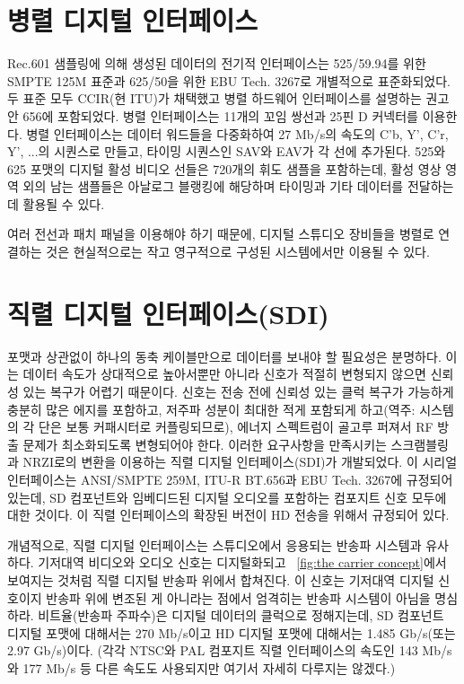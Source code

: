 \section{병렬 디지털 인터페이스}
Rec.601 샘플링에 의해 생성된 데이터의 전기적 인터페이스는 525/59.94를 위한 SMPTE 125M 표준과 625/50을 위한 EBU Tech. 3267로 개별적으로 표준화되었다. 두 표준 모두 CCIR(현 ITU)가 채택했고 병렬 하드웨어 인터페이스를 설명하는 권고안 656에 포함되었다.
병렬 인터페이스는 11개의 꼬임 쌍선과 25핀 D 커넥터를 이용한다. 병렬 인터페이스는 데이터 워드들을 다중화하여 27 Mb/s의 속도의 C'b, Y', C'r, Y', ...의 시퀀스로 만들고, 타이밍 시퀀스인 SAV와 EAV가 각 선에 추가된다.
525와 625 포맷의 디지털 활성 비디오 선들은 720개의 휘도 샘플을 포함하는데, 활성 영상 영역 외의 남는 샘플들은 아날로그 블랭킹에 해당하며 타이밍과 기타 데이터를 전달하는 데 활용될 수 있다.

여러 전선과 패치 패널을 이용해야 하기 때문에, 디지털 스튜디오 장비들을 병렬로 연결하는 것은 현실적으로는 작고 영구적으로 구성된 시스템에서만 이용될 수 있다.

\section{직렬 디지털 인터페이스(SDI)}
포맷과 상관없이 하나의 동축 케이블만으로 데이터를 보내야 할 필요성은 분명하다. 이는 데이터 속도가 상대적으로 높아서뿐만 아니라 신호가 적절히 변형되지 않으면 신뢰성 있는 복구가 어렵기 때문이다.
신호는 전송 전에 신뢰성 있는 클럭 복구가 가능하게 충분히 많은 에지를 포함하고, 저주파 성분이 최대한 적게 포함되게 하고(역주: 시스템의 각 단은 보통 커패시터로 커플링되므로), 에너지 스펙트럼이 골고루 퍼져서 RF 방출 문제가 최소화되도록 변형되어야 한다.
이러한 요구사항을 만족시키는 스크램블링과 NRZI로의 변환을 이용하는 직렬 디지털 인터페이스(SDI)가 개발되었다. 이 시리얼 인터페이스는 ANSI/SMPTE 259M, ITU-R BT.656과 EBU Tech. 3267에 규정되어 있는데, SD 컴포넌트와 임베디드된 디지털 오디오를 포함하는 컴포지트 신호 모두에 대한 것이다.
이 직렬 인터페이스의 확장된 버전이 HD 전송을 위해서 규정되어 있다.

개념적으로, 직렬 디지털 인터페이스는 스튜디오에서 응용되는 반송파 시스템과 유사하다. 기저대역 비디오와 오디오 신호는 디지털화되고 \figurename~\ref{fig:the carrier concept}에서 보여지는 것처럼 직렬 디지털 반송파 위에서 합쳐진다.
이 신호는 기저대역 디지털 신호이지 반송파 위에 변조된 게 아니라는 점에서 엄격히는 반송파 시스템이 아님을 명심하라.
비트율(반송파 주파수)은 디지털 데이터의 클럭으로 정해지는데, SD 컴포넌트 디지털 포맷에 대해서는 270 Mb/s이고 HD 디지털 포맷에 대해서는 1.485 Gb/s(또는 2.97 Gb/s)이다. (각각 NTSC와 PAL 컴포지트 직렬 인터페이스의 속도인 143 Mb/s와 177 Mb/s 등 다른 속도도 사용되지만 여기서 자세히 다루지는 않겠다.)

